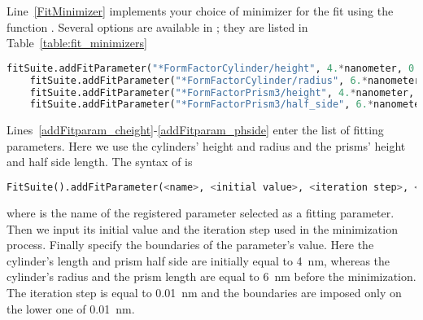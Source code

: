 Line~\ref{FitMinimizer} implements your choice of minimizer for the
fit using the function . Several options are available in \BornAgain; they are listed in
Table~\ref{table:fit_minimizers}


\begin{lstlisting}[language=python, style=eclipseboxed,
  name=exfit,nolol]
    fitSuite.addFitParameter("*FormFactorCylinder/height", 4.*nanometer, 0.01*nanometer, AttLimits.lowerLimited(0.01) ) @\label{addFitparam_cheight}@
    fitSuite.addFitParameter("*FormFactorCylinder/radius", 6.*nanometer, 0.01*nanometer, AttLimits.lowerLimited(0.01) ) @\label{addFitparam_cradius}@
    fitSuite.addFitParameter("*FormFactorPrism3/height", 4.*nanometer, 0.01*nanometer, AttLimits.lowerLimited(0.01) ) @\label{addFitparam_pheight}@
    fitSuite.addFitParameter("*FormFactorPrism3/half_side", 6.*nanometer, 0.01*nanometer, AttLimits.lowerLimited(0.01) ) @\label{addFitparam_phside}@
\end{lstlisting}

Lines~\ref{addFitparam_cheight}-\ref{addFitparam_phside} enter the
list of fitting parameters. Here we use the cylinders' height and
radius and the prisms' height and half side length. The syntax of
 is
\begin{lstlisting}[language=python, style=eclipse,numbers=none]
FitSuite().addFitParameter(<name>, <initial value>, <iteration step>, <limits>)
\end{lstlisting}
where  is the name of the registered parameter selected
as a fitting parameter. Then we input its initial
value and the iteration step used in the minimization process. Finally
 specify the boundaries of the parameter's value. Here
the cylinder's length and prism half side are initially equal to 4~nm,
whereas the cylinder's radius and the prism length are equal to 6~nm before the minimization. The
iteration step is equal to 0.01~nm and the boundaries are imposed only
on the lower one of 0.01~nm.\\




